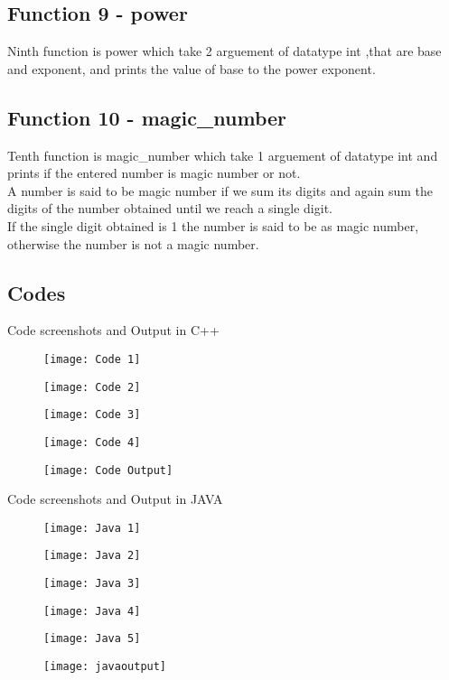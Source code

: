 \documentclass[12pt,a4paper]{article}
\begin{document}
\subsection*{Function 9 - power}
Ninth function is power which take 2 arguement of datatype int ,that are base and exponent, and prints the value of base to the power exponent.
\\

\subsection*{Function 10 - magic\_number}
Tenth function is magic\_number which take 1 arguement of datatype int and prints if the entered number is magic number or not.
\\
A number is said to be magic number if we sum its digits and again sum the digits of the number obtained until we reach a single digit.\\ If the single digit obtained is 1 the
number is said to be as magic number, otherwise the number is not a magic number. 
\\
\pagebreak
\begin{center}
\section*{\textbf{\Large Codes}}
Code screenshots and Output in C++
\begin{figure}[]
\texttt{[image: Code 1]}
\end{figure}
\begin{figure}[]
\texttt{[image: Code 2]}
\end{figure}
\begin{figure}[]
\texttt{[image: Code 3]}
\end{figure}
\begin{figure}[]
\texttt{[image: Code 4]}
\end{figure}
\begin{figure}[]
\texttt{[image: Code Output]}
\end{figure}
\end{center}
\begin{center}
\pagebreak
Code screenshots and Output in JAVA
\begin{figure}[]
\texttt{[image: Java 1]}
\end{figure}
\begin{figure}[]
\texttt{[image: Java 2]}
\end{figure}
\begin{figure}[]
\texttt{[image: Java 3]}
\end{figure}
\begin{figure}[]
\texttt{[image: Java 4]}
\end{figure}
\begin{figure}[]
\texttt{[image: Java 5]}
\end{figure}
\begin{figure}[]
\texttt{[image: javaoutput]}
\end{figure}
\end{center}
\end{document}
